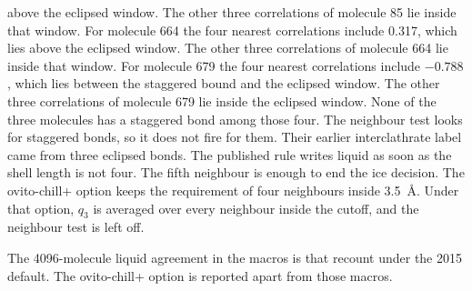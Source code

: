 above the eclipsed window.
The other three correlations of molecule 85 lie inside that window.
For molecule 664 the four nearest correlations include 0.317, which lies
above the eclipsed window.
The other three correlations of molecule 664 lie inside that window.
For molecule 679 the four nearest correlations include $-0.788$, which
lies between the staggered bound and the eclipsed window.
The other three correlations of molecule 679 lie inside the eclipsed
window.
None of the three molecules has a staggered bond among those four.
The neighbour test looks for staggered bonds, so it does not fire for
them.
Their earlier interclathrate label came from three eclipsed bonds.
The published rule writes liquid as soon as the shell length is not
four.
The fifth neighbour is enough to end the ice decision.
The ovito-chill+ option keeps the requirement of four neighbours inside
3.5~\AA.
Under that option, $q_3$ is averaged over every neighbour inside the
cutoff, and the neighbour test is left off.

The 4096-molecule liquid agreement in the macros is that recount under
the 2015 default.
The ovito-chill+ option is reported apart from those macros.
